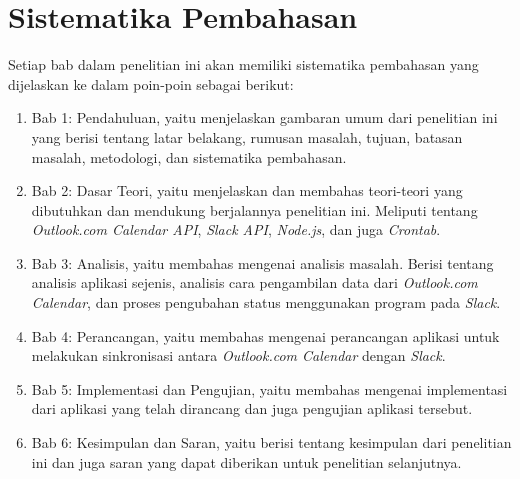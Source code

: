 \section{Sistematika Pembahasan}
\label{sec:sispem}
Setiap bab dalam penelitian ini akan memiliki sistematika pembahasan yang dijelaskan ke dalam poin-poin sebagai berikut:
\begin{enumerate}
	\item Bab 1: Pendahuluan, yaitu menjelaskan gambaran umum dari penelitian ini yang berisi tentang latar belakang, rumusan masalah, tujuan, batasan masalah, metodologi, dan sistematika pembahasan.
	\item Bab 2: Dasar Teori, yaitu menjelaskan dan membahas teori-teori yang dibutuhkan dan mendukung berjalannya penelitian ini. Meliputi tentang \textit{Outlook.com Calendar API}, \textit{Slack API}, \textit{Node.js}, dan juga \textit{Crontab}. 
	\item Bab 3: Analisis, yaitu membahas mengenai analisis masalah. Berisi tentang analisis aplikasi sejenis, analisis cara pengambilan data dari \textit{Outlook.com Calendar}, dan proses pengubahan status menggunakan program pada \textit{Slack}.
	\item Bab 4: Perancangan, yaitu membahas mengenai perancangan aplikasi untuk melakukan sinkronisasi antara \textit{Outlook.com Calendar} dengan \textit{Slack}. 
	\item Bab 5: Implementasi dan Pengujian, yaitu membahas mengenai implementasi dari aplikasi yang telah dirancang dan juga pengujian aplikasi tersebut.   
	\item Bab 6: Kesimpulan dan Saran, yaitu berisi tentang kesimpulan dari penelitian ini dan juga saran yang dapat diberikan untuk penelitian selanjutnya.  
\end{enumerate}